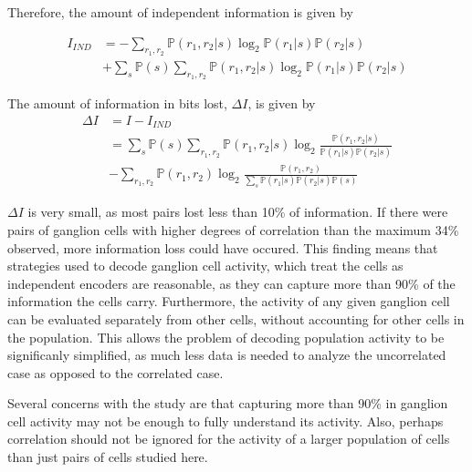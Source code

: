 \documentclass[twoside]{article}
\begin{document}
\begin{multicols}{2}
Therefore, the amount of independent information is given by

\begin{align}
	I_{IND} 
		&= -\sum_{r_1,r_2}\mathbb{P}(r_1,r_2|s)\log_2\mathbb{P}(r_1|s)\mathbb{P}(r_2|s) \\
		&+ \sum_s\mathbb{P}(s) \sum_{r_1,r_2}\mathbb{P}(r_1,r_2|s)\log_2\mathbb{P}(r_1|s)\mathbb{P}(r_2|s) 
\end{align}

The amount of information in bits lost, $\Delta I$, is given by 
\begin{align}
	\Delta I 
		&= I - I_{IND} \\
		&= \sum_s\mathbb{P}(s) \sum_{r_1,r_2}\mathbb{P}(r_1,r_2|s) \log_2 \frac{\mathbb{P}(r_1,r_2|s)}{\mathbb{P}(r_1|s)\mathbb{P}(r_2|s)} \\
		&- \sum_{r_1,r_2}\mathbb{P}(r_1,r_2) \log_2 \frac{\mathbb{P}(r_1,r_2)}{\sum_s \mathbb{P}(r_1|s)\mathbb{P}(r_2|s) \mathbb{P}(s)} 
\end{align}

$\Delta I$ is very small, as most pairs lost less than 10\% of information. If there were pairs of ganglion cells with higher degrees of correlation than the maximum 34\% observed, more information loss could have occured. This finding means that strategies used to decode ganglion cell activity, which treat the cells as independent encoders are reasonable, as they can capture more than 90\% of the information the cells carry. Furthermore, the activity of any given ganglion cell can be evaluated separately from other cells, without accounting for other cells in the population. This allows the problem of decoding population activity to be significanly simplified, as much less data is needed to analyze the uncorrelated case as opposed to the correlated case. 

Several concerns with the study are that capturing more than 90\% in ganglion cell activity may not be enough to fully understand its activity. Also, perhaps correlation should not be ignored for the activity of a larger population of cells than just pairs of cells studied here. 








\end{multicols}
\end{document}
